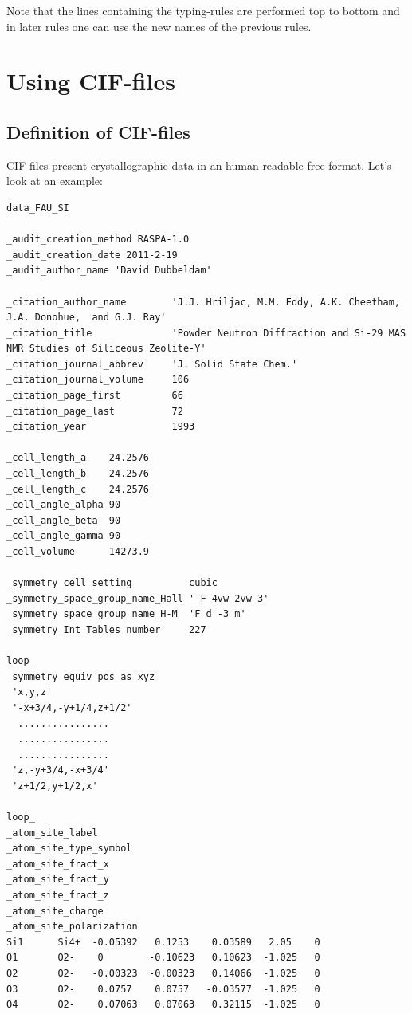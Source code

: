 Note that the lines containing the typing-rules  are performed top to bottom and in later rules one can use the new names of the previous rules.


\section{Using CIF-files}

\subsection{Definition of CIF-files}

CIF files present crystallographic data in an human readable free format. Let's look at an example:

\begin{footnotesize}
\begin{verbatim}
data_FAU_SI

_audit_creation_method RASPA-1.0
_audit_creation_date 2011-2-19
_audit_author_name 'David Dubbeldam'

_citation_author_name        'J.J. Hriljac, M.M. Eddy, A.K. Cheetham, J.A. Donohue,  and G.J. Ray'
_citation_title              'Powder Neutron Diffraction and Si-29 MAS NMR Studies of Siliceous Zeolite-Y'
_citation_journal_abbrev     'J. Solid State Chem.'
_citation_journal_volume     106
_citation_page_first         66
_citation_page_last          72
_citation_year               1993

_cell_length_a    24.2576
_cell_length_b    24.2576
_cell_length_c    24.2576
_cell_angle_alpha 90
_cell_angle_beta  90
_cell_angle_gamma 90
_cell_volume      14273.9

_symmetry_cell_setting          cubic
_symmetry_space_group_name_Hall '-F 4vw 2vw 3'
_symmetry_space_group_name_H-M  'F d -3 m'
_symmetry_Int_Tables_number     227

loop_
_symmetry_equiv_pos_as_xyz
 'x,y,z'
 '-x+3/4,-y+1/4,z+1/2'
  ................
  ................
  ................
 'z,-y+3/4,-x+3/4'
 'z+1/2,y+1/2,x'

loop_
_atom_site_label
_atom_site_type_symbol
_atom_site_fract_x
_atom_site_fract_y
_atom_site_fract_z
_atom_site_charge
_atom_site_polarization
Si1      Si4+  -0.05392   0.1253    0.03589   2.05    0
O1       O2-    0        -0.10623   0.10623  -1.025   0
O2       O2-   -0.00323  -0.00323   0.14066  -1.025   0
O3       O2-    0.0757    0.0757   -0.03577  -1.025   0
O4       O2-    0.07063   0.07063   0.32115  -1.025   0
\end{verbatim}
\end{footnotesize}

